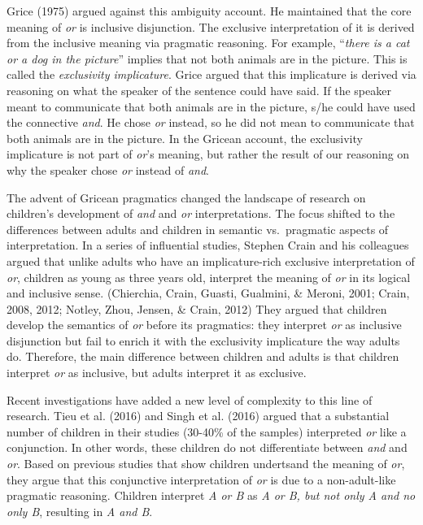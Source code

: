 \documentclass[10pt, letterpaper]{article}
\begin{document}
Grice (1975) argued against this ambiguity account. He maintained that
the core meaning of \emph{or} is inclusive disjunction. The exclusive
interpretation of it is derived from the inclusive meaning via pragmatic
reasoning. For example, ``\emph{there is a cat or a dog in the
picture}'' implies that not both animals are in the picture. This is
called the \emph{exclusivity implicature}. Grice argued that this
implicature is derived via reasoning on what the speaker of the sentence
could have said. If the speaker meant to communicate that both animals
are in the picture, s/he could have used the connective \emph{and}. He
chose \emph{or} instead, so he did not mean to communicate that both
animals are in the picture. In the Gricean account, the exclusivity
implicature is not part of \emph{or}'s meaning, but rather the result of
our reasoning on why the speaker chose \emph{or} instead of \emph{and}.

The advent of Gricean pragmatics changed the landscape of research on
children's development of \emph{and} and \emph{or} interpretations. The
focus shifted to the differences between adults and children in semantic
vs.~pragmatic aspects of interpretation. In a series of influential
studies, Stephen Crain and his colleagues argued that unlike adults who
have an implicature-rich exclusive interpretation of \emph{or}, children
as young as three years old, interpret the meaning of \emph{or} in its
logical and inclusive sense. (Chierchia, Crain, Guasti, Gualmini, \&
Meroni, 2001; Crain, 2008, 2012; Notley, Zhou, Jensen, \& Crain, 2012)
They argued that children develop the semantics of \emph{or} before its
pragmatics: they interpret \emph{or} as inclusive disjunction but fail
to enrich it with the exclusivity implicature the way adults do.
Therefore, the main difference between children and adults is that
children interpret \emph{or} as inclusive, but adults interpret it as
exclusive.

Recent investigations have added a new level of complexity to this line
of research. Tieu et al. (2016) and Singh et al. (2016) argued that a
substantial number of children in their studies (30-40\% of the samples)
interpreted \emph{or} like a conjunction. In other words, these children
do not differentiate between \emph{and} and \emph{or}. Based on previous
studies that show children undertsand the meaning of \emph{or}, they
argue that this conjunctive interpretation of \emph{or} is due to a
non-adult-like pragmatic reasoning. Children interpret \emph{A or B} as
\emph{A or B, but not only A and no only B}, resulting in \emph{A and
B}.
\end{document}
